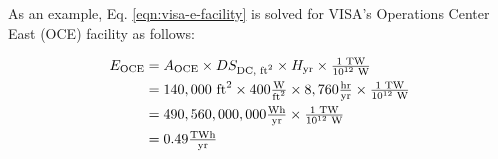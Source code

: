 As an example, Eq. \eqref{eqn:visa-e-facility} is solved for VISA's Operations Center East (OCE) facility as follows:

\begin{align}\label{eqn:visa-e-occ}
  E_\textrm{OCE} &= A_\textrm{OCE} \times DS_\textrm{DC, \textrm{ft}$^2$} \times H_\textrm{yr} \times \tfrac{1 \textrm{ TW} } { 10^{12} \textrm{ W}} \nonumber \\
                         &= 140,000 \textrm{ ft}^2 \times 400 \tfrac{\textrm{W}}{\textrm{ft$^2$}} \times 8,760 \tfrac{ \textrm{hr} } { \textrm{yr} } \times \tfrac{1 \textrm{ TW} } { 10^{12} \textrm{ W}} \nonumber \\
                         &= 490,560,000,000 \tfrac{ \textrm{{}Wh} } { \textrm{yr} } \times \tfrac{1 \textrm{ TW} } { 10^{12} \textrm{ W}} \nonumber \\
                         &= 0.49 \tfrac{ \textrm{{T}Wh} } { \textrm{yr} }
\end{align}


\begin{table}
  \begingroup
  \tiny
  \setlength{\tabcolsep}{10pt}
  \renewcommand{\arraystretch}{1.0}
\end{table}
